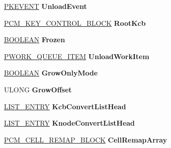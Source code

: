 \begin{DoxyCompactItemize}
\hyperlink{struct___k_e_v_e_n_t}{P\+K\+E\+V\+E\+NT} {\bfseries Unload\+Event}
\item 
\mbox{\label{struct___c_m_h_i_v_e_adaf1b35276262ca15920043bd86534e0}} 
\hyperlink{struct___c_m___k_e_y___c_o_n_t_r_o_l___b_l_o_c_k}{P\+C\+M\+\_\+\+K\+E\+Y\+\_\+\+C\+O\+N\+T\+R\+O\+L\+\_\+\+B\+L\+O\+CK} {\bfseries Root\+Kcb}
\item 
\mbox{\label{struct___c_m_h_i_v_e_a23efb5db358c108bcaeaf82ffb0529bc}} 
\hyperlink{_processor_bind_8h_a112e3146cb38b6ee95e64d85842e380a}{B\+O\+O\+L\+E\+AN} {\bfseries Frozen}
\item 
\mbox{\label{struct___c_m_h_i_v_e_a910cd28eb22a98bf238fae5044030092}} 
\hyperlink{struct___w_o_r_k___q_u_e_u_e___i_t_e_m}{P\+W\+O\+R\+K\+\_\+\+Q\+U\+E\+U\+E\+\_\+\+I\+T\+EM} {\bfseries Unload\+Work\+Item}
\item 
\mbox{\label{struct___c_m_h_i_v_e_a653f91256753021ba1cb81b0adad35b8}} 
\hyperlink{_processor_bind_8h_a112e3146cb38b6ee95e64d85842e380a}{B\+O\+O\+L\+E\+AN} {\bfseries Grow\+Only\+Mode}
\item 
\mbox{\label{struct___c_m_h_i_v_e_aeba1f44bdf3e74db93c9f416f2deea92}} 
U\+L\+O\+NG {\bfseries Grow\+Offset}
\item 
\mbox{\label{struct___c_m_h_i_v_e_ab70751ffd829a0f761bde01dd437f677}} 
\hyperlink{struct___l_i_s_t___e_n_t_r_y}{L\+I\+S\+T\+\_\+\+E\+N\+T\+RY} {\bfseries Kcb\+Convert\+List\+Head}
\item 
\mbox{\label{struct___c_m_h_i_v_e_a72fe850040605979d5da399731b55745}} 
\hyperlink{struct___l_i_s_t___e_n_t_r_y}{L\+I\+S\+T\+\_\+\+E\+N\+T\+RY} {\bfseries Knode\+Convert\+List\+Head}
\item 
\mbox{\label{struct___c_m_h_i_v_e_ae464bfd6ac9cc9cc9bc77d49deb8bc1b}} 
\hyperlink{struct___c_m___c_e_l_l___r_e_m_a_p___b_l_o_c_k}{P\+C\+M\+\_\+\+C\+E\+L\+L\+\_\+\+R\+E\+M\+A\+P\+\_\+\+B\+L\+O\+CK} {\bfseries Cell\+Remap\+Array}
\item 
\mbox{\label{struct___c_m_h_i_v_e_aa27bea722ed8dbc55a8b5bbf3af0d59d}} 

\end{DoxyCompactItemize}
